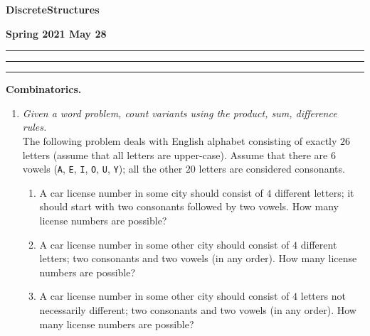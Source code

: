 \documentclass[a4paper,12pt]{article}
\begin{document}
\begin{center}
\parbox{3cm}{\flushleft\bf Discrete\linebreak Structures}
\hfill
\parbox{7cm}{}
\hfill
\parbox{3cm}{\flushright\bf Spring 2021 \linebreak May 28}
\end{center}

\hrule\vspace{2pt}\hrule

\hrule


\vspace{10pt}
{\bf Combinatorics.}

\begin{enumerate}
\item {\small \em Given a word problem, count variants using the product, sum, difference rules.}\\
The following problem deals with English alphabet consisting of exactly $26$ letters (assume that 
all letters are upper-case). Assume that there are $6$ vowels ({\tt A}, {\tt E}, {\tt I}, {\tt O}, {\tt U}, {\tt Y}); 
all the other $20$ letters are considered consonants. 
\begin{enumerate}
\item A car license number in some city should consist of $4$ different letters; it should start with 
two consonants followed by two vowels. How many license numbers are possible?
\item A car license number in some other city should consist of $4$ different letters; 
two consonants and two vowels (in any order). How many license numbers are possible?
\item A car license number in some other city should consist of $4$ letters \textendash{} not necessarily different; 
two consonants and two vowels (in any order). How many license numbers are possible?
\end{enumerate}



\end{enumerate}
\end{document}
